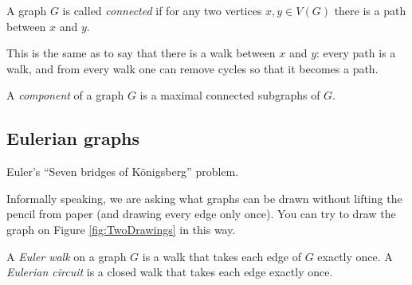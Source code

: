 \begin{page}
\setcounter{section}{1}
\setcounter{subsection}{5}
\setcounter{dfn}{17}
\label{portion:195}

\begin{dfn}
A graph $G$ is called \emph{connected} if for any two vertices $x, y \in V(G)$ there is a path between $x$ and $y$.
\end{dfn}

\end{page}

\begin{page}
\setcounter{section}{1}
\setcounter{subsection}{5}
\setcounter{dfn}{17}
\label{portion:196}


This is the same as to say that there is a walk between $x$ and $y$:
every path is a walk, and from every walk one can remove cycles so that it becomes a path.


\end{page}

\begin{page}
\setcounter{section}{1}
\setcounter{subsection}{5}
\setcounter{dfn}{18}
\label{portion:198}

\begin{dfn}
A \emph{component} of a graph $G$ is a maximal connected subgraphs of $G$.
\end{dfn}

\end{page}

\begin{page}
\setcounter{section}{1}
\setcounter{subsection}{6}
\setcounter{dfn}{18}
\label{portion:200}

\subsection{Eulerian graphs}
Euler's ``Seven bridges of K\"onigsberg'' problem.

Informally speaking, we are asking what graphs can be drawn without lifting the pencil from paper
(and drawing every edge only once).
You can try to draw the graph on Figure \ref{fig:TwoDrawings} in this way.


\end{page}

\begin{page}
\setcounter{section}{1}
\setcounter{subsection}{6}
\setcounter{dfn}{19}
\label{portion:202}

\begin{dfn}
A \emph{Euler walk} on a graph $G$ is a walk that takes each edge of $G$ exactly once.
A \emph{Eulerian circuit} is a closed walk that takes each edge exactly once.
\end{dfn}

\end{page}

